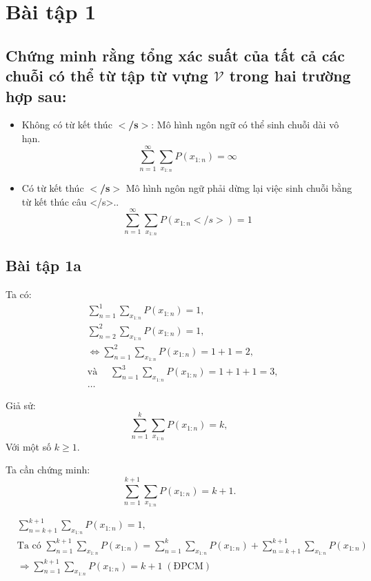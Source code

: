 \documentclass[a4paper, 15pt]{article}
\begin{document}
\section*{Bài tập 1}
\subsection*{Chứng minh rằng tổng xác suất của tất cả các chuỗi có thể từ tập từ vựng $\mathcal{V}$ trong hai trường hợp sau:}
\begin{itemize}
    \item Không có từ kết thúc $<$\textbf{/s}$>$:  Mô hình ngôn ngữ có thể sinh chuỗi dài vô hạn.
          \begin{equation}
              \sum_{n=1}^{\infty}\sum_{x_{1:n}}P(x_{1:n})=\infty\tag{1}
          \end{equation}
    \item Có từ kết thúc $<$\textbf{/s}$>$ Mô hình ngôn ngữ phải dừng lại việc sinh chuỗi bằng từ kết thúc câu </s>..
          \begin{equation}
              \sum_{n=1}^{\infty}\sum_{x_{1:n}}P(x_{1:n}</s>)=1\tag{2}
          \end{equation}
\end{itemize}
\subsection*{Bài tập 1a}
Ta có:
\[
    \begin{aligned}
         & \sum_{n=1}^{1} \sum_{x_{1:n}} P(x_{1:n}) = 1,                              \\
         & \sum_{n=2}^{2} \sum_{x_{1:n}} P(x_{1:n}) = 1,                              \\
         & \Leftrightarrow \sum_{n=1}^{2} \sum_{x_{1:n}} P(x_{1:n}) = 1 + 1 = 2,      \\
         & \text{và } \quad \sum_{n=1}^{3} \sum_{x_{1:n}} P(x_{1:n}) = 1 + 1 + 1 = 3, \\
         & \ldots
    \end{aligned}
\]

Giả sử:
\[
    \sum_{n=1}^{k} \sum_{x_{1:n}} P(x_{1:n}) = k,
\]
Với một số \( k \geq 1 \).

Ta cần chứng minh:
\[
    \sum_{n=1}^{k+1} \sum_{x_{1:n}} P(x_{1:n}) = k + 1.
\]

\[
    \begin{aligned}
         & \sum_{n=k+1}^{k+1} \sum_{x_{1:n}} P(x_{1:n}) = 1,                                                                                                  \\
         & \text{Ta có } \sum_{n=1}^{k+1} \sum_{x_{1:n}} P(x_{1:n}) = \sum_{n=1}^{k} \sum_{x_{1:n}} P(x_{1:n}) + \sum_{n=k+1}^{k+1} \sum_{x_{1:n}} P(x_{1:n}) \\
         & \Rightarrow \sum_{n=1}^{k+1} \sum_{x_{1:n}} P(x_{1:n}) = k + 1 \;(\text{ĐPCM})
    \end{aligned}
\]
\end{document}
